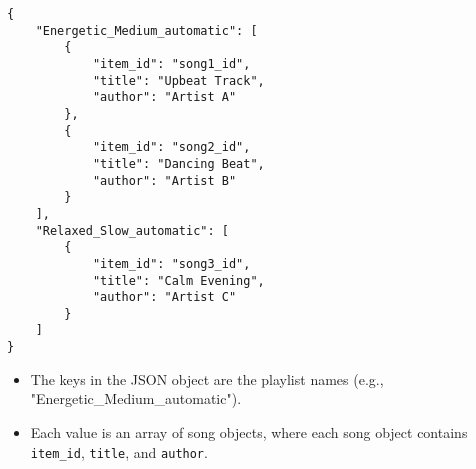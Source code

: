 \documentclass{article}
\begin{document}
\lstset{language=json, caption=Example Response: Get Generated Playlists}
\begin{lstlisting}
{
    "Energetic_Medium_automatic": [
        {
            "item_id": "song1_id",
            "title": "Upbeat Track",
            "author": "Artist A"
        },
        {
            "item_id": "song2_id",
            "title": "Dancing Beat",
            "author": "Artist B"
        }
    ],
    "Relaxed_Slow_automatic": [
        {
            "item_id": "song3_id",
            "title": "Calm Evening",
            "author": "Artist C"
        }
    ]
}
\end{lstlisting}
\begin{itemize}[noitemsep]
    \item The keys in the JSON object are the playlist names (e.g., "Energetic\_Medium\_automatic").
    \item Each value is an array of song objects, where each song object contains \texttt{item\_id}, \texttt{title}, and \texttt{author}.
\end{itemize}
\end{document}
